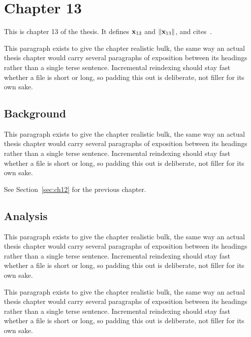 \section{Chapter 13}
\label{sec:ch13}

This is chapter 13 of the thesis. It defines $\mathbf{x}_{13}$ and $\lVert \mathbf{x}_{13} \rVert$, and cites~\cite{ref1}.

This paragraph exists to give the chapter realistic bulk, the same way an actual thesis chapter would carry several paragraphs of exposition between its headings rather than a single terse sentence. Incremental reindexing should stay fast whether a file is short or long, so padding this out is deliberate, not filler for its own sake.

\subsection{Background}
\label{sec:ch13:background}

This paragraph exists to give the chapter realistic bulk, the same way an actual thesis chapter would carry several paragraphs of exposition between its headings rather than a single terse sentence. Incremental reindexing should stay fast whether a file is short or long, so padding this out is deliberate, not filler for its own sake.

See Section~\ref{sec:ch12} for the previous chapter.

\subsection{Analysis}
\label{sec:ch13:analysis}

This paragraph exists to give the chapter realistic bulk, the same way an actual thesis chapter would carry several paragraphs of exposition between its headings rather than a single terse sentence. Incremental reindexing should stay fast whether a file is short or long, so padding this out is deliberate, not filler for its own sake.

This paragraph exists to give the chapter realistic bulk, the same way an actual thesis chapter would carry several paragraphs of exposition between its headings rather than a single terse sentence. Incremental reindexing should stay fast whether a file is short or long, so padding this out is deliberate, not filler for its own sake.
